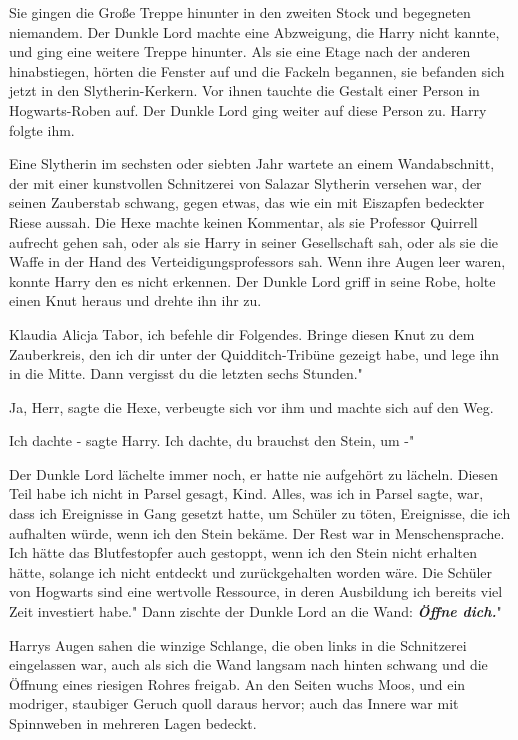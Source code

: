 Sie gingen die Große Treppe hinunter in den zweiten Stock und begegneten
niemandem. Der Dunkle Lord machte eine Abzweigung, die Harry nicht kannte, und
ging eine weitere Treppe hinunter. Als sie eine Etage nach der anderen
hinabstiegen, hörten die Fenster auf und die Fackeln begannen, sie befanden sich
jetzt in den Slytherin-Kerkern. Vor ihnen tauchte die Gestalt einer Person in
Hogwarts-Roben auf. Der Dunkle Lord ging weiter auf diese Person zu. Harry
folgte ihm.

Eine Slytherin im sechsten oder siebten Jahr wartete an einem Wandabschnitt, der
mit einer kunstvollen Schnitzerei von Salazar Slytherin versehen war, der seinen
Zauberstab schwang, gegen etwas, das wie ein mit Eiszapfen bedeckter Riese
aussah. Die Hexe machte keinen Kommentar, als sie Professor Quirrell aufrecht
gehen sah, oder als sie Harry in seiner Gesellschaft sah, oder als sie die Waffe
in der Hand des Verteidigungsprofessors sah. Wenn ihre Augen leer waren, konnte
Harry den es nicht erkennen. Der Dunkle Lord griff in seine Robe, holte einen
Knut heraus und drehte ihn ihr zu.

\glqq Klaudia Alicja Tabor, ich befehle dir Folgendes. Bringe diesen Knut zu dem
Zauberkreis, den ich dir unter der Quidditch-Tribüne gezeigt habe, und lege ihn
in die Mitte. Dann vergisst du die letzten sechs Stunden."

\glqq Ja, Herr\grqq{}, sagte die Hexe, verbeugte sich vor ihm und machte sich
auf den Weg.

\glqq Ich dachte -\grqq{} sagte Harry. \glqq Ich dachte, du brauchst den Stein,
um -"

Der Dunkle Lord lächelte immer noch, er hatte nie aufgehört zu lächeln. \glqq
Diesen Teil habe ich nicht in Parsel gesagt, Kind. Alles, was ich in Parsel
sagte, war, dass ich Ereignisse in Gang gesetzt hatte, um Schüler zu töten,
Ereignisse, die ich aufhalten würde, wenn ich den Stein bekäme. Der Rest war in
Menschensprache. Ich hätte das Blutfestopfer auch gestoppt, wenn ich den Stein
nicht erhalten hätte, solange ich nicht entdeckt und zurückgehalten worden wäre.
Die Schüler von Hogwarts sind eine wertvolle Ressource, in deren Ausbildung ich
bereits viel Zeit investiert habe." Dann zischte der Dunkle Lord an die Wand:
\glqq \textbf{\emph{Öffne dich.}}"

Harrys Augen sahen die winzige Schlange, die oben links in die Schnitzerei
eingelassen war, auch als sich die Wand langsam nach hinten schwang und die
Öffnung eines riesigen Rohres freigab. An den Seiten wuchs Moos, und ein
modriger, staubiger Geruch quoll daraus hervor; auch das Innere war mit
Spinnweben in mehreren Lagen bedeckt.

